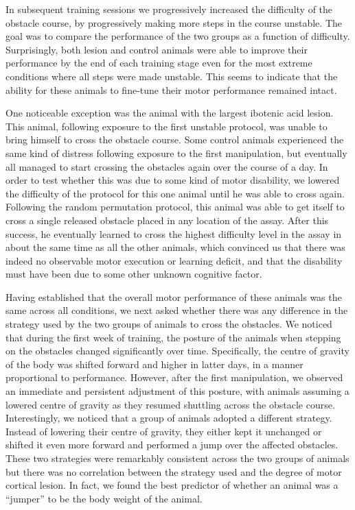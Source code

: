 In subsequent training sessions we progressively increased the difficulty of the obstacle course, by progressively making more steps in the course unstable. The goal was to compare the performance of the two groups as a function of difficulty. Surprisingly, both lesion and control animals were able to improve their performance by the end of each training stage even for the most extreme conditions where all steps were made unstable. This seems to indicate that the ability for these animals to fine-tune their motor performance remained intact.

One noticeable exception was the animal with the largest ibotenic acid lesion. This animal, following exposure to the first unstable protocol, was unable to bring himself to cross the obstacle course. Some control animals experienced the same kind of distress following exposure to the first manipulation, but eventually all managed to start crossing the obstacles again over the course of a day. In order to test whether this was due to some kind of motor disability, we lowered the difficulty of the protocol for this one animal until he was able to cross again. Following the random permutation protocol, this animal was able to get itself to cross a single released obstacle placed in any location of the assay. After this success, he eventually learned to cross the highest difficulty level in the assay in about the same time as all the other animals, which convinced us that there was indeed no observable motor execution or learning deficit, and that the disability must have been due to some other unknown cognitive factor.

Having established that the overall motor performance of these animals was the same across all conditions, we next asked whether there was any difference in the strategy used by the two groups of animals to cross the obstacles. We noticed that during the first week of training, the posture of the animals when stepping on the obstacles changed significantly over time. Specifically, the centre of gravity of the body was shifted forward and higher in latter days, in a manner proportional to performance. However, after the first manipulation, we observed an immediate and persistent adjustment of this posture, with animals assuming a lowered centre of gravity as they resumed shuttling across the obstacle course. Interestingly, we noticed that a group of animals adopted a different strategy. Instead of lowering their centre of gravity, they either kept it unchanged or shifted it even more forward and performed a jump over the affected obstacles. These two strategies were remarkably consistent across the two groups of animals but there was no correlation between the strategy used and the degree of motor cortical lesion. In fact, we found the best predictor of whether an animal was a ``jumper'' to be the body weight of the animal.

